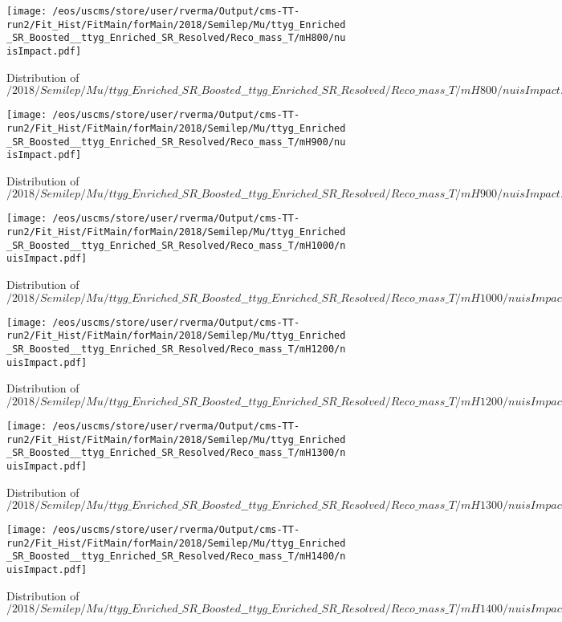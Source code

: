 \begin{figure}
\centering
\texttt{[image: /eos/uscms/store/user/rverma/Output/cms-TT-run2/Fit\_Hist/FitMain/forMain/2018/Semilep/Mu/ttyg\_Enriched\_SR\_Boosted\_\_ttyg\_Enriched\_SR\_Resolved/Reco\_mass\_T/mH800/nuisImpact.pdf]}
\caption{Distribution of $/2018/Semilep/Mu/ttyg\_Enriched\_SR\_Boosted\_\_ttyg\_Enriched\_SR\_Resolved/Reco\_mass\_T/mH800/nuisImpact.pdf$}
\end{figure}

\begin{figure}
\centering
\texttt{[image: /eos/uscms/store/user/rverma/Output/cms-TT-run2/Fit\_Hist/FitMain/forMain/2018/Semilep/Mu/ttyg\_Enriched\_SR\_Boosted\_\_ttyg\_Enriched\_SR\_Resolved/Reco\_mass\_T/mH900/nuisImpact.pdf]}
\caption{Distribution of $/2018/Semilep/Mu/ttyg\_Enriched\_SR\_Boosted\_\_ttyg\_Enriched\_SR\_Resolved/Reco\_mass\_T/mH900/nuisImpact.pdf$}
\end{figure}

\begin{figure}
\centering
\texttt{[image: /eos/uscms/store/user/rverma/Output/cms-TT-run2/Fit\_Hist/FitMain/forMain/2018/Semilep/Mu/ttyg\_Enriched\_SR\_Boosted\_\_ttyg\_Enriched\_SR\_Resolved/Reco\_mass\_T/mH1000/nuisImpact.pdf]}
\caption{Distribution of $/2018/Semilep/Mu/ttyg\_Enriched\_SR\_Boosted\_\_ttyg\_Enriched\_SR\_Resolved/Reco\_mass\_T/mH1000/nuisImpact.pdf$}
\end{figure}

\begin{figure}
\centering
\texttt{[image: /eos/uscms/store/user/rverma/Output/cms-TT-run2/Fit\_Hist/FitMain/forMain/2018/Semilep/Mu/ttyg\_Enriched\_SR\_Boosted\_\_ttyg\_Enriched\_SR\_Resolved/Reco\_mass\_T/mH1200/nuisImpact.pdf]}
\caption{Distribution of $/2018/Semilep/Mu/ttyg\_Enriched\_SR\_Boosted\_\_ttyg\_Enriched\_SR\_Resolved/Reco\_mass\_T/mH1200/nuisImpact.pdf$}
\end{figure}

\begin{figure}
\centering
\texttt{[image: /eos/uscms/store/user/rverma/Output/cms-TT-run2/Fit\_Hist/FitMain/forMain/2018/Semilep/Mu/ttyg\_Enriched\_SR\_Boosted\_\_ttyg\_Enriched\_SR\_Resolved/Reco\_mass\_T/mH1300/nuisImpact.pdf]}
\caption{Distribution of $/2018/Semilep/Mu/ttyg\_Enriched\_SR\_Boosted\_\_ttyg\_Enriched\_SR\_Resolved/Reco\_mass\_T/mH1300/nuisImpact.pdf$}
\end{figure}

\begin{figure}
\centering
\texttt{[image: /eos/uscms/store/user/rverma/Output/cms-TT-run2/Fit\_Hist/FitMain/forMain/2018/Semilep/Mu/ttyg\_Enriched\_SR\_Boosted\_\_ttyg\_Enriched\_SR\_Resolved/Reco\_mass\_T/mH1400/nuisImpact.pdf]}
\caption{Distribution of $/2018/Semilep/Mu/ttyg\_Enriched\_SR\_Boosted\_\_ttyg\_Enriched\_SR\_Resolved/Reco\_mass\_T/mH1400/nuisImpact.pdf$}
\end{figure}

